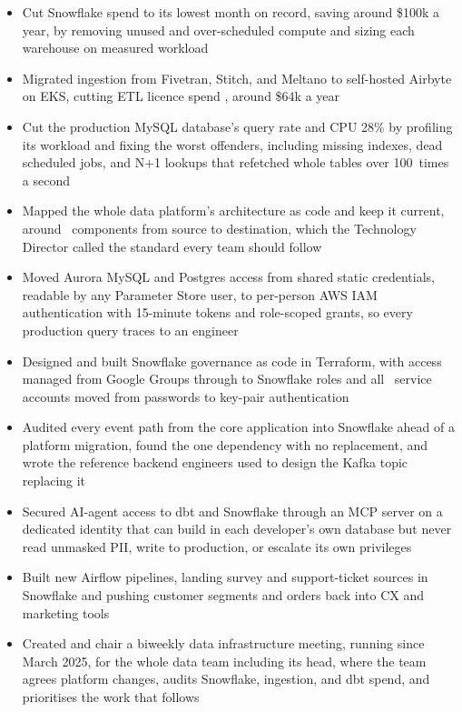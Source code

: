 \documentclass[10pt,a4paper,withhyper,ragged2e]{altacv}
\begin{document}
\begin{itemize}
  \item Cut Snowflake spend  to its lowest month on record, saving around \$100k a
        year, by removing unused and over-scheduled compute and sizing each warehouse on measured
        workload
  \item Migrated ingestion from Fivetran, Stitch, and Meltano to self-hosted Airbyte on EKS,
        cutting ETL licence spend , around \$64k a year
  \item Cut the production MySQL database's query rate  and CPU 28\% by profiling
        its workload and fixing the worst offenders, including missing indexes, dead scheduled
        jobs, and N+1 lookups that refetched whole tables over 100~times a second
  \item Mapped the whole data platform's architecture as code and keep it current, around
        ~components from source to destination, which the Technology Director called
        the standard every team should follow
  \item Moved Aurora MySQL and Postgres access from shared static credentials, readable by any
        Parameter Store user, to per-person AWS IAM authentication with 15-minute tokens and
        role-scoped grants, so every production query traces to an engineer
  \item Designed and built Snowflake governance as code in Terraform, with access managed from
        Google Groups through to Snowflake roles and all ~service accounts moved from
        passwords to key-pair authentication
  \item Audited every event path from the core application into Snowflake ahead of a platform
        migration, found the one dependency with no replacement, and wrote the reference backend
        engineers used to design the Kafka topic replacing it
  \item Secured AI-agent access to dbt and Snowflake through an MCP server on a dedicated identity
        that can build in each developer's own database but never read unmasked PII, write to
        production, or escalate its own privileges
  \item Built  new Airflow pipelines, landing survey and support-ticket sources in
        Snowflake and pushing customer segments and orders back into CX and marketing tools
  \item Created and chair a biweekly data infrastructure meeting, running since March 2025, for the
        whole data team including its head, where the team agrees platform changes, audits
        Snowflake, ingestion, and dbt spend, and prioritises the work that follows
\end{itemize}
\end{document}
